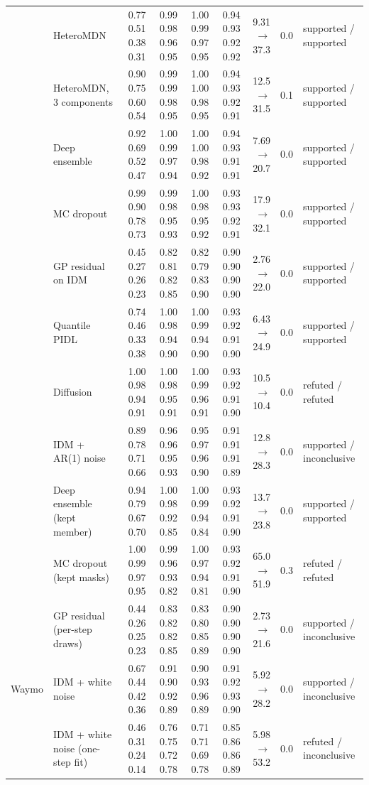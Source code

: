 \begin{longtable}{llrrrrrrl}
 & HeteroMDN & 0.77 0.51 0.38 0.31 & 0.99 0.98 0.96 0.95 & 1.00 0.99 0.97 0.95 & 0.94 0.93 0.92 0.92 & 9.31 $\rightarrow$ 37.3 & 0.0 & supported / supported \\
 & HeteroMDN, 3 components & 0.90 0.75 0.60 0.54 & 0.99 0.99 0.98 0.95 & 1.00 1.00 0.98 0.95 & 0.94 0.93 0.92 0.91 & 12.5 $\rightarrow$ 31.5 & 0.1 & supported / supported \\
 & Deep ensemble & 0.92 0.69 0.52 0.47 & 1.00 0.99 0.97 0.94 & 1.00 1.00 0.98 0.92 & 0.94 0.93 0.91 0.91 & 7.69 $\rightarrow$ 20.7 & 0.0 & supported / supported \\
 & MC dropout & 0.99 0.90 0.78 0.73 & 0.99 0.98 0.95 0.93 & 1.00 0.98 0.95 0.92 & 0.93 0.93 0.92 0.91 & 17.9 $\rightarrow$ 32.1 & 0.0 & supported / supported \\
 & GP residual on IDM & 0.45 0.27 0.26 0.23 & 0.82 0.81 0.82 0.85 & 0.82 0.79 0.83 0.90 & 0.90 0.90 0.90 0.90 & 2.76 $\rightarrow$ 22.0 & 0.0 & supported / supported \\
 & Quantile PIDL & 0.74 0.46 0.33 0.38 & 1.00 0.98 0.94 0.90 & 1.00 0.99 0.94 0.90 & 0.93 0.92 0.91 0.90 & 6.43 $\rightarrow$ 24.9 & 0.0 & supported / supported \\
 & Diffusion & 1.00 0.98 0.94 0.91 & 1.00 0.98 0.95 0.91 & 1.00 0.99 0.96 0.91 & 0.93 0.92 0.91 0.90 & 10.5 $\rightarrow$ 10.4 & 0.0 & refuted / refuted \\
 & IDM + AR(1) noise & 0.89 0.78 0.71 0.66 & 0.96 0.96 0.95 0.93 & 0.95 0.97 0.96 0.90 & 0.91 0.91 0.91 0.89 & 12.8 $\rightarrow$ 28.3 & 0.0 & supported / inconclusive \\
 & Deep ensemble (kept member) & 0.94 0.79 0.67 0.70 & 1.00 0.98 0.92 0.85 & 1.00 0.99 0.94 0.84 & 0.93 0.92 0.91 0.90 & 13.7 $\rightarrow$ 23.8 & 0.0 & supported / supported \\
 & MC dropout (kept masks) & 1.00 0.99 0.97 0.95 & 0.99 0.96 0.93 0.82 & 1.00 0.97 0.94 0.81 & 0.93 0.92 0.91 0.90 & 65.0 $\rightarrow$ 51.9 & 0.3 & refuted / refuted \\
 & GP residual (per-step draws) & 0.44 0.26 0.25 0.23 & 0.83 0.82 0.82 0.85 & 0.83 0.80 0.85 0.89 & 0.90 0.90 0.90 0.90 & 2.73 $\rightarrow$ 21.6 & 0.0 & supported / inconclusive \\
\midrule
Waymo & IDM + white noise & 0.67 0.44 0.42 0.36 & 0.91 0.90 0.92 0.89 & 0.90 0.93 0.96 0.89 & 0.91 0.92 0.93 0.90 & 5.92 $\rightarrow$ 28.2 & 0.0 & supported / inconclusive \\
 & IDM + white noise (one-step fit) & 0.46 0.31 0.24 0.14 & 0.76 0.75 0.72 0.78 & 0.71 0.71 0.69 0.78 & 0.85 0.86 0.86 0.89 & 5.98 $\rightarrow$ 53.2 & 0.0 & refuted / inconclusive \\

\end{longtable}
